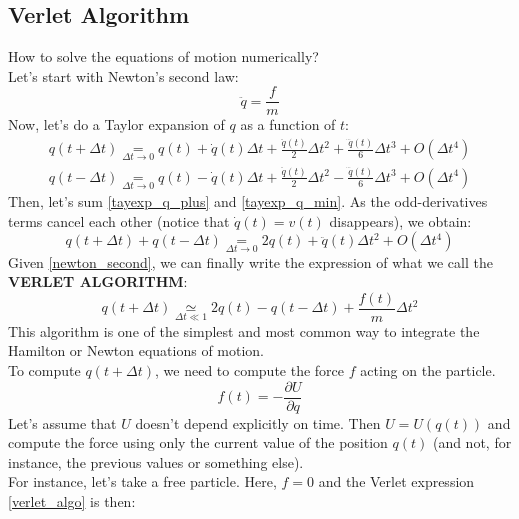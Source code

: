 \subsection{Verlet Algorithm}
    How to solve the equations of motion numerically?
    \\Let's start with Newton's second law:
    \begin{equation}
        \ddot{q}=\frac{f}{m}\label{newton_second}
    \end{equation}
    Now, let's do a Taylor expansion of $q$ as a function of $t$:
    \begin{align}
        q(t + \Delta t) \underset{\Delta t \to 0}{=}q(t)+\dot{q}(t)\Delta t+\frac{\ddot{q}(t)}{2}\Delta t^2+\frac{\dddot{q}(t)}{6}\Delta t^3+O(\Delta t^4) \label{tayexp_q_plus}\\
        q(t - \Delta t) \underset{\Delta t \to 0}{=}q(t)-\dot{q}(t)\Delta t+\frac{\ddot{q}(t)}{2}\Delta t^2-\frac{\dddot{q}(t)}{6}\Delta t^3+O(\Delta t^4) \label{tayexp_q_min}
    \end{align}
    Then, let's sum \eqref{tayexp_q_plus} and \eqref{tayexp_q_min}. As the odd-derivatives terms cancel each other (notice that $\dot{q}(t)=v(t)$ disappears), we obtain:
    \begin{equation}
        q(t + \Delta t)+q(t - \Delta t)\underset{\Delta t \to 0}{=}2q(t)+\ddot{q}(t)\Delta t^2+O(\Delta t^4) \label{just_bef_verlet}
    \end{equation}
    Given \eqref{newton_second}, we can finally write the expression of what we call the \textbf{VERLET ALGORITHM}:
    \begin{equation}
        \boxed{q(t+\Delta t)\underset{\Delta t \ll 1}{\simeq} 2q(t)-q(t-\Delta t)+\frac{f(t)}{m}\Delta t^2}\label{verlet_algo}
    \end{equation}
    This algorithm is one of the simplest and most common way to integrate the Hamilton or Newton equations of motion.\\
    To compute $q(t+\Delta t)$, we need to compute the force $f$ acting on the particle.
    \begin{equation}
        f(t)=-\frac{\partial U}{\partial q}
    \end{equation}
    Let's assume that $U$ doesn't depend explicitly on time. Then $U=U(q(t))$ and compute the force using only the current value of the position $q(t)$ (and not, for instance, the previous values or something else).\\
    For instance, let's take a free particle. Here, $f=0$  and the Verlet expression \eqref{verlet_algo} is then:
